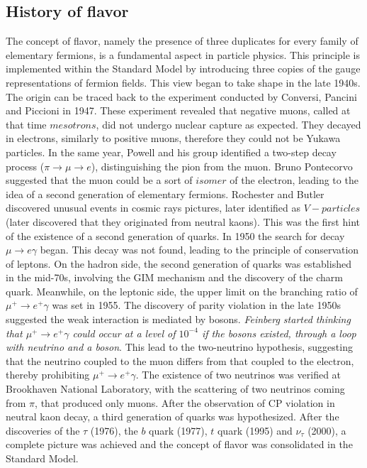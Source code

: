 \subsection{History of flavor}
The concept of flavor, namely the presence of three duplicates for every family of elementary fermions, is a fundamental aspect in particle physics. This principle is implemented within the Standard Model by introducing three copies of the gauge representations of fermion fields. This view began to take shape in the late 1940s. The origin can be traced back to the experiment conducted by Conversi, Pancini and Piccioni in 1947. These experiment revealed that negative muons, called at that time $mesotrons$, did not undergo nuclear capture as expected. They decayed in electrons, similarly to positive muons, therefore they could not be Yukawa particles. In the same year, Powell and his group identified a two-step decay process ($\pi \rightarrow \mu \rightarrow e$), distinguishing the pion from the muon. Bruno Pontecorvo suggested that the muon could be a sort of $isomer$ of the electron, leading to the idea of a second generation of elementary fermions. Rochester and Butler discovered unusual events in cosmic rays pictures, later identified as $V-particles$ (later discovered that they originated from neutral kaons). This was the first hint of the existence of a second generation of quarks. In 1950 the search for decay $\mu \rightarrow e \gamma$ began. This decay was not found, leading to the principle of conservation of leptons. On the hadron side, the second generation of quarks was established in the mid-70s, involving the GIM mechanism and the discovery of the charm quark. Meanwhile, on the leptonic side, the upper limit on the branching ratio of $\mu^+ \rightarrow  e^+ \gamma$ was set in 1955. The discovery of parity violation in the late 1950s suggested the weak interaction is mediated by bosons. \textit{Feinberg started thinking that $\mu^+ \rightarrow  e^+ \gamma$ could occur at a level of $10^{-4}$ if the bosons existed, through a loop with neutrino and a boson}. This lead to the two-neutrino hypothesis, suggesting that the neutrino coupled to the muon differs from that coupled to the electron, thereby prohibiting $\mu^+ \rightarrow  e^+ \gamma$. The existence of two neutrinos was verified at Brookhaven National Laboratory, with the scattering of two neutrinos coming from $\pi$, that produced only muons. After the observation of CP violation in neutral kaon decay, a third generation of quarks was hypothesized. After the discoveries of the $\tau$ (1976), the $b$ quark (1977), $t$ quark (1995) and $\nu_{\tau}$ (2000), a complete picture was achieved and the concept of flavor was consolidated in the Standard Model.


